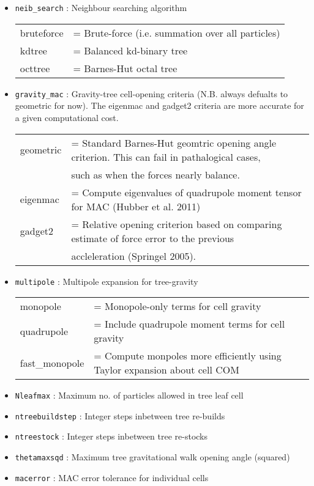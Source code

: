 \documentclass[a4paper]{article}
\newcommand{\var}[1]{\texttt{#1}}
\begin{document}
\begin{itemize}

\item \var{neib\_search} : Neighbour searching algorithm \vspace{0.1cm} \\
\begin{tabular}{ll}
bruteforce & = Brute-force (i.e. summation over all particles) \\
kdtree     & = Balanced kd-binary tree \\
octtree    & = Barnes-Hut octal tree
\end{tabular}

\item \var{gravity\_mac} : Gravity-tree cell-opening criteria (N.B. always defualts to geometric for now). The eigenmac and gadget2 criteria are more accurate for a given computational cost. \vspace{0.1cm} \\
\begin{tabular} {ll}
geometric & = Standard Barnes-Hut geomtric opening angle criterion. This can fail in pathalogical cases,\\
	      & \quad such as when the forces nearly balance. \\
eigenmac  & = Compute eigenvalues of quadrupole moment tensor for MAC (Hubber et al. 2011) \\
gadget2   & = Relative opening criterion based on comparing estimate of force error to the previous \\
		  & \quad accleleration (Springel 2005).
\end{tabular}

\item \var{multipole} : Multipole expansion for tree-gravity \vspace{0.1cm} \\
\begin{tabular} {ll}
monopole       & = Monopole-only terms for cell gravity \\
quadrupole     & = Include quadrupole moment terms for cell gravity \\
fast\_monopole & = Compute monpoles more efficiently using Taylor expansion about cell COM
\end{tabular}

\item \var{Nleafmax} : Maximum no. of particles allowed in tree leaf cell

\item \var{ntreebuildstep} : Integer steps inbetween tree re-builds

\item \var{ntreestock} : Integer steps inbetween tree re-stocks

\item \var{thetamaxsqd} : Maximum tree gravitational walk opening angle (squared)

\item \var{macerror} : MAC error tolerance for individual cells

\end{itemize}
\end{document}
